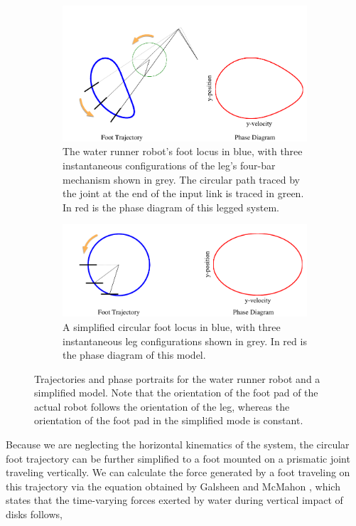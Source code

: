 \begin{figure}[tb]
	\centering
	\begin{subfigure}[t]{0.48\textwidth}
		\centering
		\includegraphics[width = \textwidth]{figures/foot_trajs.pdf}
		\caption{The water runner robot's foot locus in blue, with three instantaneous configurations of the leg's four-bar mechanism shown in grey. The circular path traced by the joint at the end of the input link is traced in green. In red is the phase diagram of this legged system.}
		\label{fig:trajrob}
	\end{subfigure}
    \begin{subfigure}[t]{0.48\textwidth}
		\centering
		\includegraphics[width = \textwidth]{figures/foot_trajs2.pdf}
		\caption{A simplified circular foot locus in blue, with three instantaneous leg configurations shown in grey. In red is the phase diagram of this model.}
		\label{fig:trajsimp}
	\end{subfigure}
	\caption{Trajectories and phase portraits for the water runner robot and a simplified model. Note that the orientation of the foot pad of the actual robot follows the orientation of the leg, whereas the orientation of the foot pad in the simplified mode is constant.}
	\label{fig:traj}
\end{figure}

Because we are neglecting the horizontal kinematics of the system, the circular foot trajectory can be further simplified to a foot mounted on a prismatic joint traveling vertically. We can calculate the force generated by a foot traveling on this trajectory via the equation obtained by Galsheen and McMahon \cite{glasheen1996vertical}, which states that the time-varying forces exerted by water during vertical impact of disks follows,

